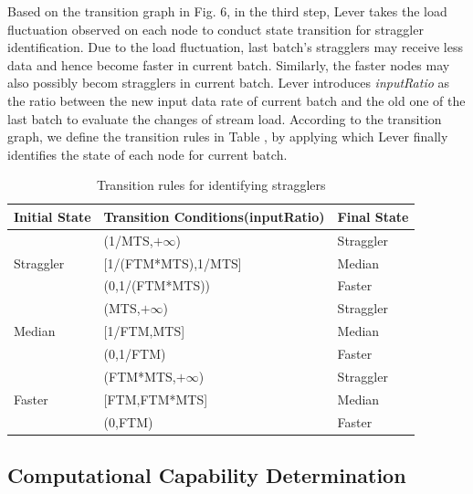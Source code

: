   Based on the transition graph in Fig. 6, in the third step, Lever takes the load fluctuation observed on each node to conduct state transition for straggler identification. Due to the load fluctuation, last batch's stragglers may receive less data and hence become faster in current batch. Similarly, the faster nodes may also possibly becom stragglers in current batch. Lever introduces \emph{inputRatio} as the ratio between the new input data rate of current batch and the old one of the last batch to evaluate the changes of stream load. According to the transition graph, we define the transition rules in Table \uppercase\expandafter{}, by applying which Lever finally identifies the state of each node for current batch.
  \begin{table}[htbp]
    \footnotesize
    \centering
    \caption{Transition rules for identifying stragglers}
    \begin{threeparttable}
    \centering
      \begin{tabular}{|p{1.5cm}|p{4.3cm}|p{1.4cm}|}
        \hline
        Initial State & Transition Conditions(inputRatio) & Final State \\
        \hline
        \multirow{3}{2cm}{Straggler} &
        (1/MTS,$+\infty$) & Straggler \\
        \cline{2-3}
        & [1/(FTM*MTS),1/MTS] & Median \\
        \cline{2-3}
        & (0,1/(FTM*MTS)) & Faster \\
        \hline
        \multirow{3}{2cm}{Median} &
        (MTS,$+\infty$) & Straggler \\
        \cline{2-3}
        & [1/FTM,MTS] & Median \\
        \cline{2-3}
        & (0,1/FTM) & Faster \\
        \hline
        \multirow{3}{2cm}{Faster} &
        (FTM*MTS,$+\infty$) & Straggler \\
        \cline{2-3}
        & [FTM,FTM*MTS] & Median \\
        \cline{2-3}
        & (0,FTM) & Faster \\
        \hline
      \end{tabular}
    \end{threeparttable}
    \label{Table1}
  \end{table}

\subsection{Computational Capability Determination}

